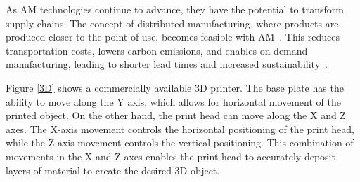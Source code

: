 As AM technologies continue to advance, they have the potential to transform supply chains. The concept of distributed manufacturing, where products are produced closer to the point of use, becomes feasible with AM~\cite{Jandyal.2022}. This reduces transportation costs, lowers carbon emissions, and enables on-demand manufacturing, leading to shorter lead times and increased sustainability~\cite{Haleem.2019}.


Figure \ref{3D} shows a commercially available 3D printer. The base plate has the ability to move along the Y axis, which allows for horizontal movement of the printed object. On the other hand, the print head can move along the X and Z axes. The X-axis movement controls the horizontal positioning of the print head, while the Z-axis movement controls the vertical positioning. This combination of movements in the X and Z axes enables the print head to accurately deposit layers of material to create the desired 3D object.

